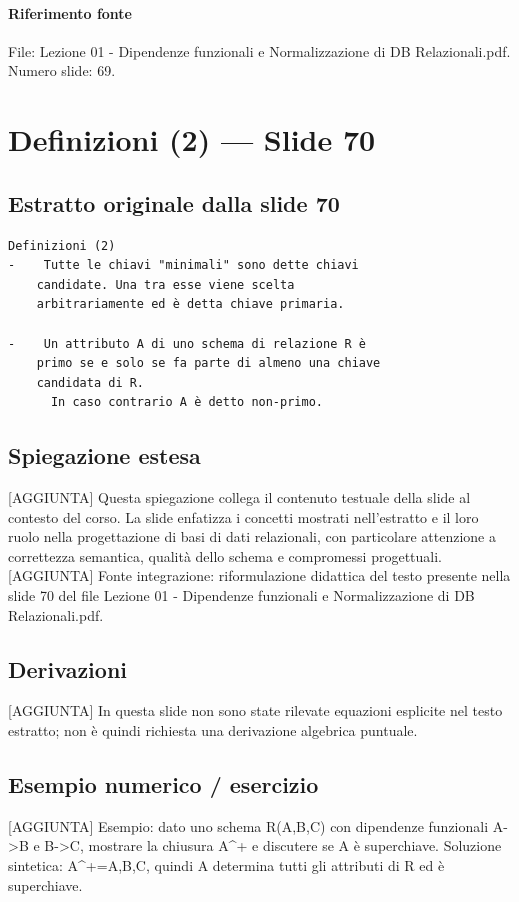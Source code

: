 \documentclass[11pt]{article}
\begin{document}
\paragraph{Riferimento fonte} File: Lezione 01 - Dipendenze funzionali e Normalizzazione di DB Relazionali.pdf. Numero slide: 69.
\section{Definizioni (2) --- Slide 70}
\subsection*{Estratto originale dalla slide 70}
\begin{lstlisting}
Definizioni (2)
-    Tutte le chiavi "minimali" sono dette chiavi
    candidate. Una tra esse viene scelta
    arbitrariamente ed è detta chiave primaria.

-    Un attributo A di uno schema di relazione R è
    primo se e solo se fa parte di almeno una chiave
    candidata di R.
      In caso contrario A è detto non-primo.
\end{lstlisting}
\subsection*{Spiegazione estesa}
[AGGIUNTA] Questa spiegazione collega il contenuto testuale della slide al contesto del corso. La slide enfatizza i concetti mostrati nell'estratto e il loro ruolo nella progettazione di basi di dati relazionali, con particolare attenzione a correttezza semantica, qualità dello schema e compromessi progettuali.
[AGGIUNTA] Fonte integrazione: riformulazione didattica del testo presente nella slide 70 del file Lezione 01 - Dipendenze funzionali e Normalizzazione di DB Relazionali.pdf.
\subsection*{Derivazioni}
[AGGIUNTA] In questa slide non sono state rilevate equazioni esplicite nel testo estratto; non è quindi richiesta una derivazione algebrica puntuale.
\subsection*{Esempio numerico / esercizio}
[AGGIUNTA] Esempio: dato uno schema R(A,B,C) con dipendenze funzionali A->B e B->C, mostrare la chiusura A^+ e discutere se A è superchiave. Soluzione sintetica: A^+={A,B,C}, quindi A determina tutti gli attributi di R ed è superchiave.
\end{document}
